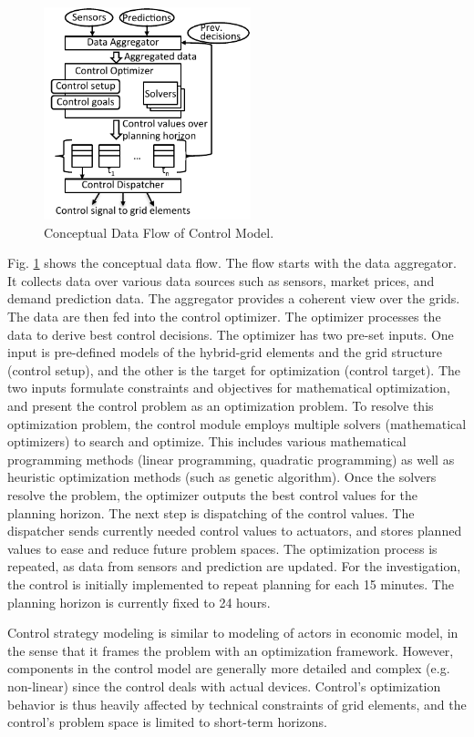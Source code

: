\documentclass[a4paper,twoside]{article}
\begin{document}
\begin{figure}[t]
  \centering
  \includegraphics[width=60mm]{figures/control_flow.pdf}
  \caption{Conceptual Data Flow of Control Model.}
  \label{fig:control}
\end{figure}
Fig. \ref{fig:control} shows the conceptual data flow. 
The flow starts with the data  aggregator. It collects data
over various data sources such as sensors, market prices, and demand 
prediction data. 
The aggregator provides a coherent view over the  grids.  
The data are then fed into the control optimizer. The optimizer
processes the data to derive best control decisions. 
The optimizer has two pre-set inputs. One input is pre-defined models
of the hybrid-grid elements and the grid structure (control setup),
and the other is the target for optimization (control target). 
The two inputs formulate constraints and objectives for mathematical
optimization, and present the control problem as an optimization
problem. 
To resolve this optimization problem, the control module employs
multiple solvers (mathematical optimizers) to search and optimize.
This includes various mathematical  programming methods (linear
programming, quadratic programming) as well as heuristic optimization
methods (such as genetic algorithm). 
Once the solvers resolve the problem, the optimizer outputs the
best control values for the planning horizon. 
The next step is dispatching of the control values. The dispatcher
sends currently needed control values to actuators, and stores
planned values to ease and reduce future problem spaces. The
optimization process is repeated, as data from sensors and prediction
are updated. For the investigation, the control is initially
implemented to repeat planning for each 15 minutes. The planning
horizon is currently fixed to 24 hours. 

Control strategy modeling is similar to modeling of actors in 
economic model, in the sense that it frames the problem with
an optimization framework. However, components in the control model
are generally more detailed and complex (e.g. non-linear) since the 
control deals with actual devices. Control's optimization behavior is 
thus heavily affected by technical constraints of grid
elements, and the control's problem space is limited to short-term
horizons. %
\end{document}
